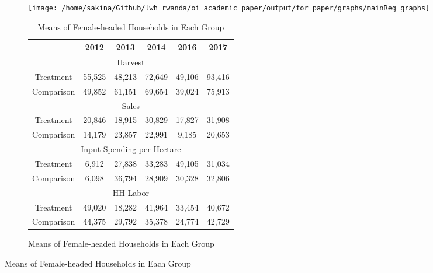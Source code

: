 \documentclass[12pt]{article}
\begin{document}
\begin{figure}[H] 
	\caption{Dynamics of the Gender Gaps}
	\begin{subfigure}{\textwidth}
		\centering
		\texttt{[image: /home/sakina/Github/lwh\_rwanda/oi\_academic\_paper/output/for\_paper/graphs/mainReg\_graphs]} 
	\end{subfigure} 
	\begin{subfigure}{\textwidth}
		\begin{table}[H]
			\centering 
			\caption*{Means of Female-headed Households in Each Group}
			\begin{tabular}{cccccc} \hline 
				& 2012                                        & 2013                                        & 2014                                        & 2016                                        & 2017                                        \\ \hline 
				\multicolumn{6}{c}{\small Harvest} \\
				Treatment    &     55,525 &     48,213 &     72,649 &     49,106 &     93,416 \\ 
				Comparison   &     49,852 &     61,151 &     69,654 &     39,024 &     75,913 \\ 
				\multicolumn{6}{c}{\small Sales} \\
				Treatment    &     20,846      &     18,915      &     30,829      &     17,827      &     31,908      \\ 
				Comparison   &     14,179      &     23,857      &     22,991      &      9,185      &     20,653      \\ 
				\multicolumn{6}{c}{\small Input Spending per Hectare} \\
				Treatment    &      6,912 &     27,838 &     33,283 &     49,105 &     31,034 \\ 
				Comparison   &      6,098 &     36,794 &     28,909 &     30,328 &     32,806 \\ 
				\multicolumn{6}{c}{\small HH Labor} \\
				Treatment    &     49,020        &     18,282        &     41,964        &     33,454        &     40,672        \\ 
				Comparison   &     44,375        &     29,792        &     35,378        &     24,774        &     42,729        \\ \hline 
			\end{tabular}
		\end{table}
	\end{subfigure}
	\label{fig:mainReg_graph}
\end{figure}
\end{document}
